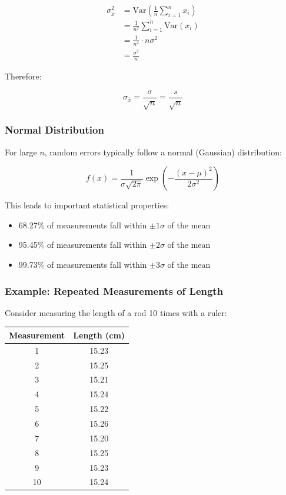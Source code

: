 \documentclass[twoside]{book}
\begin{document}
\begin{align}
\sigma_{\bar{x}}^2 &= \text{Var}\left(\frac{1}{n}\sum_{i=1}^{n} x_i\right) \\
&= \frac{1}{n^2}\sum_{i=1}^{n}\text{Var}(x_i) \\
&= \frac{1}{n^2} \cdot n \sigma^2 \\
&= \frac{\sigma^2}{n}
\end{align}

Therefore:

\begin{equation}
\sigma_{\bar{x}} = \frac{\sigma}{\sqrt{n}} = \frac{s}{\sqrt{n}}
\end{equation}

\subsubsection{Normal Distribution}

For large $n$, random errors typically follow a normal (Gaussian) distribution:

\begin{equation}
f(x) = \frac{1}{\sigma\sqrt{2\pi}}\exp\left(-\frac{(x-\mu)^2}{2\sigma^2}\right)
\end{equation}

This leads to important statistical properties:
\begin{itemize}
\item 68.27\% of measurements fall within $\pm 1\sigma$ of the mean
\item 95.45\% of measurements fall within $\pm 2\sigma$ of the mean
\item 99.73\% of measurements fall within $\pm 3\sigma$ of the mean
\end{itemize}

\subsubsection{Example: Repeated Measurements of Length}

Consider measuring the length of a rod 10 times with a ruler:

\begin{center}
\begin{tabular}{cc}
\toprule
Measurement & Length (cm) \\
\midrule
1 & 15.23 \\
2 & 15.25 \\
3 & 15.21 \\
4 & 15.24 \\
5 & 15.22 \\
6 & 15.26 \\
7 & 15.20 \\
8 & 15.25 \\
9 & 15.23 \\
10 & 15.24 \\
\bottomrule
\end{tabular}
\end{center}
\end{document}
